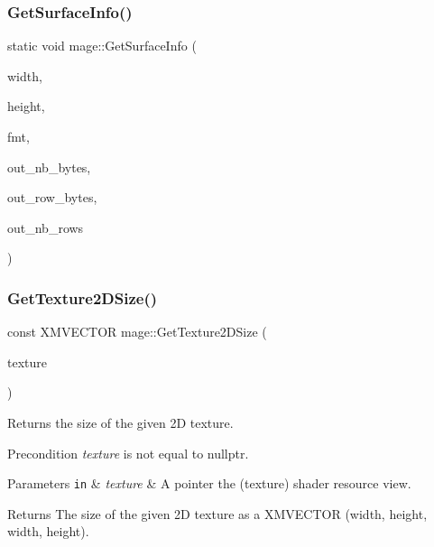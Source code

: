 \subsubsection{\texorpdfstring{Get\+Surface\+Info()}{GetSurfaceInfo()}}
{\footnotesize\ttfamily static void mage\+::\+Get\+Surface\+Info (\begin{DoxyParamCaption}\item[{\+\_\+\+In\+\_\+ size\+\_\+t}]{width,  }\item[{\+\_\+\+In\+\_\+ size\+\_\+t}]{height,  }\item[{\+\_\+\+In\+\_\+ D\+X\+G\+I\+\_\+\+F\+O\+R\+M\+AT}]{fmt,  }\item[{\+\_\+\+Out\+\_\+opt\+\_\+ size\+\_\+t $\ast$}]{out\+\_\+nb\+\_\+bytes,  }\item[{\+\_\+\+Out\+\_\+opt\+\_\+ size\+\_\+t $\ast$}]{out\+\_\+row\+\_\+bytes,  }\item[{\+\_\+\+Out\+\_\+opt\+\_\+ size\+\_\+t $\ast$}]{out\+\_\+nb\+\_\+rows }\end{DoxyParamCaption})\hspace{0.3cm}{\ttfamily [static]}}

\hypertarget{namespacemage_a32e962380f439a26629371c492643616}{}\label{namespacemage_a32e962380f439a26629371c492643616} 
\subsubsection{\texorpdfstring{Get\+Texture2\+D\+Size()}{GetTexture2DSize()}}
{\footnotesize\ttfamily const X\+M\+V\+E\+C\+T\+OR mage\+::\+Get\+Texture2\+D\+Size (\begin{DoxyParamCaption}\item[{I\+D3\+D11\+Shader\+Resource\+View $\ast$}]{texture }\end{DoxyParamCaption})}

Returns the size of the given 2D texture.

\begin{DoxyPrecond}{Precondition}
{\itshape texture} is not equal to {\ttfamily nullptr}. 
\end{DoxyPrecond}

\begin{DoxyParams}[1]{Parameters}
\mbox{\tt in}  & {\em texture} & A pointer the (texture) shader resource view. \\
\hline
\end{DoxyParams}
\begin{DoxyReturn}{Returns}
The size of the given 2D texture as a {\ttfamily X\+M\+V\+E\+C\+T\+OR} (width, height, width, height). 
\end{DoxyReturn}

